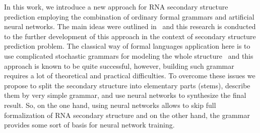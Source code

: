 In this work, we introduce a new approach for RNA secondary structure prediction employing the combination of ordinary formal grammars and artificial neural networks. The main ideas were outlined in~\cite{grigorevcomposition,lunina2019secondary} and this research is conducted to the further development of this approach in the context of secondary structure prediction problem. The classical way of formal languages application here is to use complicated stochastic grammars for modeling the whole structure~\cite{knudsen1999rna,dowell2004evaluation,rivas2000language} and this approach is known to be quite successful, however, building such grammar requires a lot of theoretical and practical difficulties. To overcome these issues we propose to split the secondary structure into elementary parts (stems), describe them by very simple grammar, and use neural networks to synthesize the final result. So, on the one hand, using neural networks allows to skip full formalization of RNA secondary structure and on the other hand, the grammar provides some sort of basis for neural network training. 